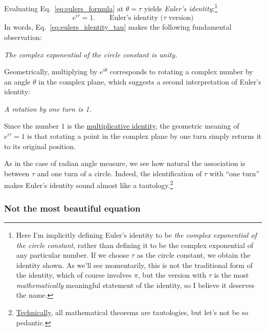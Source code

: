 Evaluating Eq.~\eqref{eq:eulers_formula} at $\theta = \tau$ yields \emph{Euler's identity}:\footnote{Here I'm implicitly defining Euler's identity to be \emph{the complex exponential of the circle constant}, rather than defining it to be the complex exponential of any particular number. If we choose $\tau$ as the circle constant, we obtain the identity shown. As we'll see momentarily, this is not the traditional form of the identity, which of course involves $\pi$, but the version with $\tau$ is the most \emph{mathematically} meaningful statement of the identity, so I believe it deserves the name.}
\begin{equation}
\label{eq:eulers_identity_tau}
e^{i\tau} = 1. \qquad\mbox{Euler's identity ($\tau$ version)}
\end{equation}
In words, Eq.~\eqref{eq:eulers_identity_tau} makes the following fundamental observation:

\begin{center}
\emph{The complex exponential of the circle constant is unity.}
\end{center}

Geometrically, multiplying by $e^{i\theta}$ corresponds to rotating a complex number by an angle $\theta$ in the complex plane, which suggests a second interpretation of Euler's identity:

\begin{center}
\emph{A rotation by one turn is 1.}
\end{center}

\noindent Since the number $1$ is the \href{https://en.wikipedia.org/wiki/Identity_element}{multiplicative identity}, the geometric meaning of $e^{i\tau} = 1$ is that rotating a point in the complex plane by one turn simply returns it to its original position.

As in the case of radian angle measure, we see how natural the association is between $\tau$ and one turn of a circle. Indeed, the identification of $\tau$ with ``one turn'' makes Euler's identity sound almost like a tautology.\footnote{\href{https://xkcd.com/1475/}{Technically}, all mathematical theorems are tautologies, but let's not be so pedantic.}

    \subsubsection{Not the most beautiful equation} %
    \label{sec:not_the_most_beautiful_equation}


